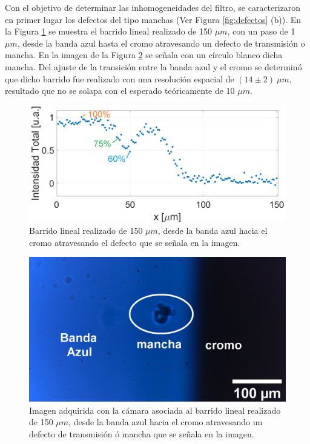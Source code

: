 Con el objetivo de determinar las inhomogeneidades del filtro, se caracterizaron en primer lugar los defectos del tipo manchas  (Ver Figura \ref{fig:defectos} (b)). En la Figura \ref{fig:barinted} se muestra el barrido lineal realizado de 150 $\mu m$, con un paso de 1 $\mu m$, desde la banda azul hasta el cromo atravesando un defecto de transmisión o mancha. En la imagen de la Figura \ref{fig:batod} se señala con un círculo blanco dicha mancha. Del ajuste de la transición entre la banda azul y el cromo se determinó que dicho barrido fue realizado con una resolución espacial de $(14 \pm 2)~\mu m$, resultado que no se solapa con el esperado teóricamente de 10 $\mu m$.

 \begin{figure}[H]
	\centering
	\includegraphics[width=1.0\textwidth]{Figs/microespectrometro/barridolamancha.png}
	\caption{Barrido lineal realizado de 150 $\mu m$, desde la banda azul hacia el cromo atravesando el defecto que se señala en la imagen.}
	\label{fig:barinted}
\end{figure}

 \begin{figure}[H]
	\centering
	\includegraphics[scale=0.4]{Figs/microespectrometro/barridoenzdefecto.png}
	\caption{Imagen adquirida con la cámara asociada al barrido lineal realizado de 150 $\mu m$, desde la banda azul hacia el cromo atravesando un defecto de transmisión ó mancha que se señala en la imagen.}
	\label{fig:batod}
\end{figure}

